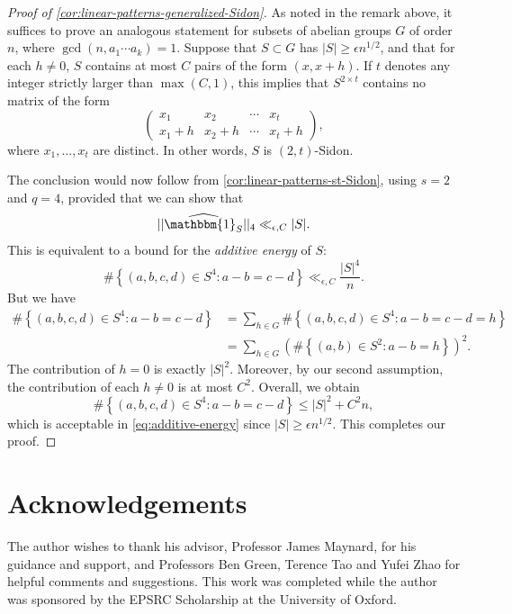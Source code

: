 \documentclass[reqno,11pt]{amsart}
\theoremstyle{definition}
\theoremstyle{remark}
\numberwithin{equation}{section}
\newcommand{\one}{\mathbbm{1}}
\renewcommand{\hat}{\widehat}
\begin{document}
\begin{proof}[Proof of \cref{cor:linear-patterns-generalized-Sidon}]
As noted in the remark above, it suffices to prove an analogous statement for subsets of abelian groups $G$ of order $n$, where $\gcd(n, a_1\cdots a_k) = 1$. Suppose that $S \subset G$ has $|S| \ge \epsilon n^{1/2}$, and that for each $h \neq 0$, $S$ contains at most $C$ pairs of the form $(x, x+h)$. If $t$ denotes any integer strictly larger than $\max(C, 1)$, this implies that $S^{2 \times t}$ contains no matrix of the form
\[
    \begin{pmatrix}
        x_1 & x_2 & \cdots & x_t \\
        x_1 + h & x_2 + h & \cdots & x_t + h
    \end{pmatrix},
\]
where $x_1, \ldots, x_t$ are distinct. In other words, $S$ is $(2, t)$-Sidon.

The conclusion would now follow from \cref{cor:linear-patterns-st-Sidon}, using $s = 2$ and $q = 4$, provided that we can show that
\[
    ||\hat{\one_S}||_4 \ll_{\epsilon,C} |S|.
\]
This is equivalent to a bound for the \emph{additive energy} of $S$:
\begin{equation} \label{eq:additive-energy}
    \#\left\{(a, b, c, d) \in S^4 : a - b = c - d \right\} \ll_{\epsilon,C} \frac{|S|^4}{n}.
\end{equation}
But we have 
\[
\begin{aligned}
    \#\left\{(a, b, c, d) \in S^4 : a - b = c - d \right\}
    &=
    \sum_{h \in G} \#\left\{(a, b, c, d) \in S^4 : a - b = c - d = h\right\}
    \\
    &=
    \sum_{h \in G} \left(\#\left\{(a, b) \in S^2 : a - b = h \right\}\right)^2.
\end{aligned}
\]
The contribution of $h = 0$ is exactly $|S|^2$. Moreover, by our second assumption, the contribution of each $h \neq 0$ is at most $C^2$. Overall, we obtain
\[
    \#\left\{(a, b, c, d) \in S^4 : a - b = c - d \right\} \le |S|^2 + C^2 n,
\]
which is acceptable in \cref{eq:additive-energy} since $|S| \ge \epsilon n^{1/2}$. This completes our proof.
\end{proof}








\section{Acknowledgements}

The author wishes to thank his advisor, Professor James Maynard, for his guidance and support, and Professors Ben Green, Terence Tao and Yufei Zhao for helpful comments and suggestions. This work was completed while the author was sponsored by the EPSRC Scholarship at the University of Oxford.
\end{document}
